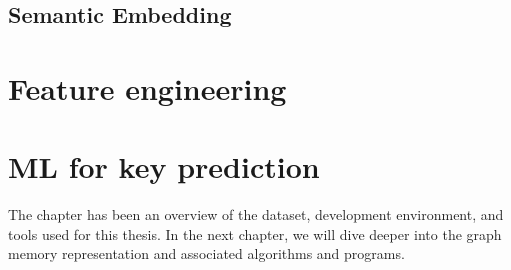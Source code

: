 \subsection{Semantic Embedding}\label{sec:mem_2_graph:semantic_embedding}



\section{Feature engineering}

\section{ML for key prediction}

The chapter has been an overview of the dataset, development environment, and tools used for this thesis. In the next chapter, we will dive deeper into the graph memory representation and associated algorithms and programs.

